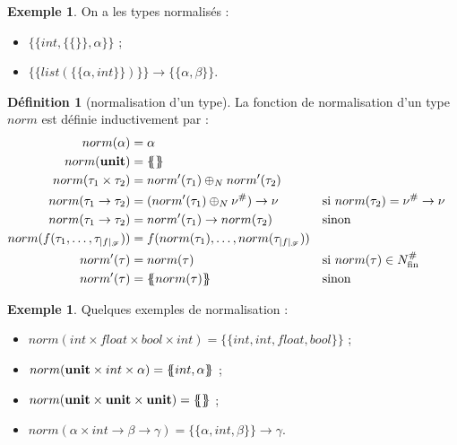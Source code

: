 \documentclass[a4paper]{report}
\theoremstyle{definition}
\newtheorem{definition}[theoreme]{Définition}
\newtheorem{exemple}[theoreme]{Exemple}
\newcommand{\unit}{\bold{unit}}
\newcommand{\fmsets}[1]{{#1}_{\mathrm {fin}}^\#}
\newcommand{\fmset}[1]{\{\!\!\{#1\}\!\!\}}
\newcommand{\F}{\mathscr F}
\begin{document}
\begin{exemple}
	On a les types normalisés :
	\begin{itemize}
		\item $\fmset {int, \fmset {}, \alpha}$ ;
		\item $\fmset {list (\fmset {\alpha, int})} \rightarrow \fmset {\alpha, \beta}$.
	\end{itemize}
\end{exemple}

\begin{definition}[normalisation d'un type]
	La fonction de normalisation d'un type $norm$ est définie inductivement par :
	\begin{align*}
			norm (\alpha) &=
			\alpha
		\\
			norm (\unit) &=
			\fmset {}
		\\
			norm (\tau_1 \times \tau_2) &=
			norm' (\tau_1) \oplus_N norm' (\tau_2)
		\\
			norm (\tau_1 \rightarrow \tau_2) &=
			(norm' (\tau_1) \oplus_N \nu^\#) \rightarrow \nu &&
			\text{si } norm (\tau_2) = \nu^\# \rightarrow \nu
		\\
			norm (\tau_1 \rightarrow \tau_2) &=
			norm' (\tau_1) \rightarrow norm (\tau_2) &&
			\text{sinon}
		\\
			norm (f (\tau_1, \dots, \tau_{|f|_\F})) &=
			f (norm (\tau_1), \dots, norm (\tau_{|f|_\F}))
		\\
			norm' (\tau) &=
			norm (\tau) &&
			\text{si } norm (\tau) \in \fmsets N
		\\
			norm' (\tau) &=
			\fmset {norm (\tau)} &&
			\text{sinon}
	\end{align*}
\end{definition}

\begin{exemple}
	Quelques exemples de normalisation :
	\begin{itemize}
		\item $norm (int \times float \times bool \times int) = \fmset {int, int, float, bool}$ ;
		\item $norm (\unit \times int \times \alpha) = \fmset {int, \alpha}$ ;
		\item $norm (\unit \times \unit \times \unit) = \fmset {}$ ;
		\item $norm (\alpha \times int \rightarrow \beta \rightarrow \gamma) = \fmset {\alpha, int, \beta} \rightarrow \gamma$.
	\end{itemize}
\end{exemple}
\end{document}
